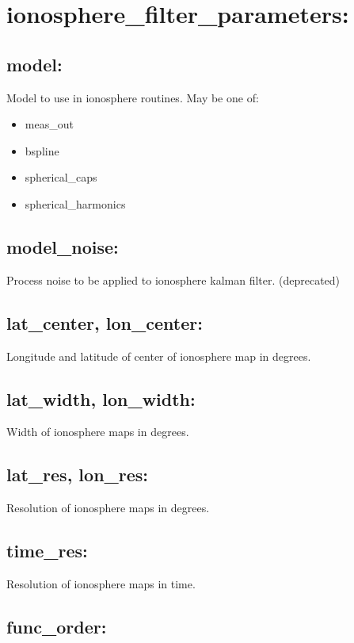 \section{ionosphere\_filter\_parameters:}

\subsection*{model:}

Model to use in ionosphere routines. May be one of:
\begin{itemize}
\item meas\_out
\item bspline
\item spherical\_caps
\item spherical\_harmonics
\end{itemize}

\subsection*{model\_noise:}

Process noise to be applied to ionosphere kalman filter. (deprecated)

\subsection*{lat\_center, lon\_center:}

Longitude and latitude of center of ionosphere map in degrees.

\subsection*{lat\_width, lon\_width:}

Width of ionosphere maps in degrees.

\subsection*{lat\_res, lon\_res:}

Resolution of ionosphere maps in degrees.

\subsection*{time\_res:}

Resolution of ionosphere maps in time.

\subsection*{func\_order:}


